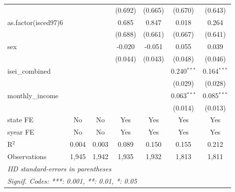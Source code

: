 \begin{table}[htbp]
\begin{tabular}{lcccccc}
                          &               &              & (0.692)               & (0.665) & (0.670)       & (0.643)\\   
      as.factor(isced97)6 &               &              & 0.685                 & 0.847   & 0.018         & 0.264\\   
                          &               &              & (0.688)               & (0.661) & (0.667)       & (0.641)\\   
      sex                 &               &              & -0.020                & -0.051  & 0.055         & 0.039\\   
                          &               &              & (0.044)               & (0.043) & (0.048)       & (0.046)\\   
      isei\_combined      &               &              &                       &         & 0.240$^{***}$ & 0.164$^{***}$\\   
                          &               &              &                       &         & (0.029)       & (0.028)\\   
      monthly\_income     &               &              &                       &         & 0.063$^{***}$ & 0.085$^{***}$\\   
                          &               &              &                       &         & (0.014)       & (0.013)\\   
      state FE            & No            & No           & Yes                   & Yes     & Yes           & Yes\\  
      syear FE            & No            & No           & Yes                   & Yes     & Yes           & Yes\\  
      R$^2$               & 0.004         & 0.003        & 0.089                 & 0.150   & 0.155         & 0.212\\  
      Observations        & 1,945         & 1,942        & 1,935                 & 1,932   & 1,813         & 1,811\\  
      \midrule \midrule
      \multicolumn{7}{l}{\emph{IID standard-errors in parentheses}}\\
      \multicolumn{7}{l}{\emph{Signif. Codes: ***: 0.001, **: 0.01, *: 0.05}}\\
   \end{tabular}
\end{table}



